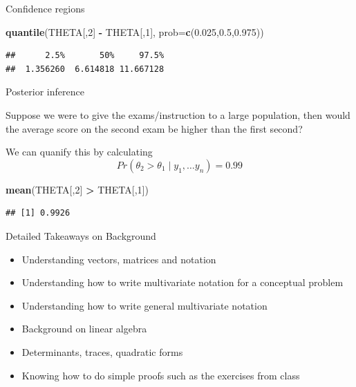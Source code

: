 \documentclass[
  ignorenonframetext,
]{beamer}
\newenvironment{Shaded}{\begin{snugshade}}{\end{snugshade}}
\newcommand{\DataTypeTok}[1]{\textcolor[rgb]{0.13,0.29,0.53}{#1}}
\newcommand{\DecValTok}[1]{\textcolor[rgb]{0.00,0.00,0.81}{#1}}
\newcommand{\FloatTok}[1]{\textcolor[rgb]{0.00,0.00,0.81}{#1}}
\newcommand{\KeywordTok}[1]{\textcolor[rgb]{0.13,0.29,0.53}{\textbf{#1}}}
\newcommand{\NormalTok}[1]{#1}
\newcommand{\OperatorTok}[1]{\textcolor[rgb]{0.81,0.36,0.00}{\textbf{#1}}}
\newcommand{\StringTok}[1]{\textcolor[rgb]{0.31,0.60,0.02}{#1}}
\providecommand{\tightlist}{%
  \setlength{\itemsep}{0pt}\setlength{\parskip}{0pt}}
\begin{document}
\begin{frame}[fragile]{Confidence regions}
\protect\hypertarget{confidence-regions}{}

\begin{Shaded}
\begin{Highlighting}[]
\KeywordTok{quantile}\NormalTok{(THETA[,}\DecValTok{2}\NormalTok{] }\OperatorTok{-}\StringTok{ }\NormalTok{THETA[,}\DecValTok{1}\NormalTok{], }\DataTypeTok{prob=}\KeywordTok{c}\NormalTok{(}\FloatTok{0.025}\NormalTok{,}\FloatTok{0.5}\NormalTok{,}\FloatTok{0.975}\NormalTok{))}
\end{Highlighting}
\end{Shaded}

\begin{verbatim}
##      2.5%       50%     97.5% 
##  1.356260  6.614818 11.667128
\end{verbatim}

\end{frame}

\begin{frame}[fragile]{Posterior inference}
\protect\hypertarget{posterior-inference-1}{}

Suppose we were to give the exams/instruction to a large population,
then would the average score on the second exam be higher than the first
second?

We can quanify this by calculating
\[Pr(\theta_2 > \theta_1 \mid y_1,\ldots y_n) = 0.99 
\]

\begin{Shaded}
\begin{Highlighting}[]
\KeywordTok{mean}\NormalTok{(THETA[,}\DecValTok{2}\NormalTok{] }\OperatorTok{>}\StringTok{ }\NormalTok{THETA[,}\DecValTok{1}\NormalTok{])}
\end{Highlighting}
\end{Shaded}

\begin{verbatim}
## [1] 0.9926
\end{verbatim}

\end{frame}

\begin{frame}{Detailed Takeaways on Background}
\protect\hypertarget{detailed-takeaways-on-background}{}

\begin{itemize}
\tightlist
\item
  Understanding vectors, matrices and notation\\
\item
  Understanding how to write multivariate notation for a conceptual
  problem
\item
  Understanding how to write general multivariate notation
\item
  Background on linear algebra
\item
  Determinants, traces, quadratic forms
\item
  Knowing how to do simple proofs such as the exercises from class
\end{itemize}

\end{frame}
\end{document}
